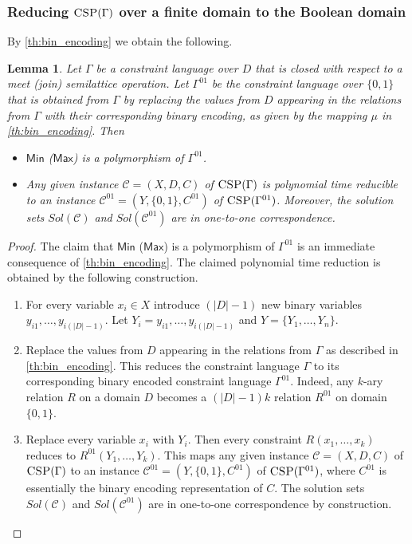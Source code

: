 \documentclass[11pt]{article}
\newcommand{\Cc}{\mathcal{C}}
\newcommand{\CSP}{\textsc{CSP}}
\newcommand{\Max}{\textsf{Max}}
\newcommand{\Min}{\textsf{Min}}
\newcommand{\1}{\textbf{1}}
\newcommand\uval{{(|D|-1)}}
\newtheorem{lemma}[theorem]{Lemma}
\begin{document}
\subsubsection[Reducing CSP(Gamma) over a finite domain to the Boolean domain]{Reducing $\CSP(\Gamma)$ over a finite domain to the Boolean domain}\label{sect:mapping2bool}
By \cref{th:bin_encoding} we obtain the following.

\begin{lemma}\label{th:reduction_csp}
Let $\Gamma$ be a constraint language over $D$ that is closed with respect to a meet (join) semilattice operation. Let $\Gamma^{01}$ be the constraint language over $\{0,1\}$ that is obtained from $\Gamma$ by replacing the values from $D$ appearing in the relations from $\Gamma$ with their corresponding binary encoding, as given by the mapping $\mu$ in \cref{th:bin_encoding}. Then 
\begin{itemize}
    \item $\Min$ ($\Max$) is a polymorphism of $\Gamma^{01}$.
    \item Any given instance $\Cc=(X,D,C)$ of $\CSP(\Gamma)$ is polynomial time reducible to an instance $\Cc^{01}=(Y,\{0,1\},C^{01})$ of $\CSP(\Gamma^{01})$. Moreover, the solution sets $Sol(\Cc)$ and $Sol(\Cc^{01})$ are in one-to-one correspondence.  
\end{itemize} 
\end{lemma}
\begin{proof}
The claim that $\Min$ ($\Max$) is a polymorphism of $\Gamma^{01}$ is an immediate consequence of \cref{th:bin_encoding}. The claimed polynomial time reduction is obtained by the following construction.
\begin{enumerate} 
    \item For every variable $x_i\in X$ introduce $\uval$ new binary variables $y_{i1},\ldots, y_{i\uval}$. Let $Y_i=y_{i1},\ldots, y_{i\uval}$ and $Y=\{Y_1,\ldots, Y_n\}$.
    \item Replace the values from $D$ appearing in the relations from $\Gamma$ as described in \cref{th:bin_encoding}. This reduces the constraint language $\Gamma$ to its corresponding binary encoded constraint language $\Gamma^{01}$. 
    Indeed, any $k$-ary relation $R$ on a domain $D$ becomes a $\uval k$ relation $R^{01}$ on domain $\{0,1\}$.
\item Replace every variable $x_i$ with $Y_i$. Then every constraint $R(x_1,\ldots, x_k)$ reduces to $R^{01}(Y_1,\ldots, Y_k)$.
    This maps any given instance $\Cc=(X,D,C)$ of $\CSP(\Gamma)$ to an instance $\Cc^{01}=(Y,\{0,1\},C^{01})$ of $\CSP(\Gamma^{01})$, where $C^{01}$ is essentially the binary encoding representation of $C$. The solution sets $Sol(\Cc)$ and $Sol(\Cc^{01})$ are in one-to-one correspondence by construction. 
\end{enumerate}    
\end{proof}
\end{document}

